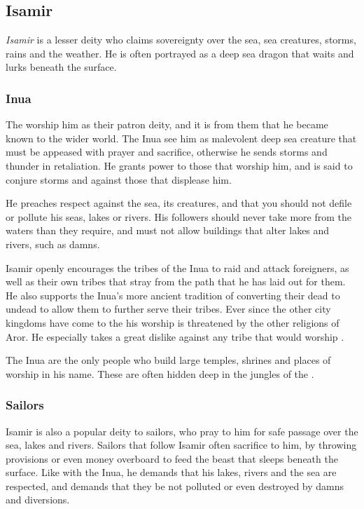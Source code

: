 \subsection{Isamir}
\label{sec:Isamir}

\emph{Isamir} is a lesser deity who claims sovereignty over the sea, sea
creatures, storms, rains and the weather. He is often portrayed as a deep
sea dragon that waits and lurks beneath the surface.

\subsubsection{Inua}

The  worship him as their patron deity, and it is from
them that he became known to the wider world. The Inua see him as malevolent
deep sea creature that must be appeased with prayer and sacrifice, otherwise
he sends storms and thunder in retaliation. He grants power to those that
worship him, and is said to conjure storms and against those that displease
him.

He preaches respect against the sea, its creatures, and that you should not
defile or pollute his seas, lakes or rivers. His followers should never take
more from the waters than they require, and must not allow buildings that
alter lakes and rivers, such as damns.

Isamir openly encourages the tribes of the Inua to raid and attack foreigners,
as well as their own tribes that stray from the path that he has laid out for
them. He also supports the Inua's more ancient tradition of converting their
dead to undead to allow them to further serve their tribes. Ever since the
other city kingdoms have come to the  his worship is
threatened by the other religions of Aror. He especially takes a great dislike
against any tribe that would worship .

The Inua are the only people who build large temples, shrines and places of
worship in his name. These are often hidden deep in the jungles of the
.

\subsubsection{Sailors}

Isamir is also a popular deity to sailors, who pray to him for safe passage
over the sea, lakes and rivers. Sailors that follow Isamir often sacrifice
to him, by throwing provisions or even money overboard to feed the beast
that sleeps beneath the surface. Like with the Inua, he demands that his
lakes, rivers and the sea are respected, and demands that they be not
polluted or even destroyed by damns and diversions.

